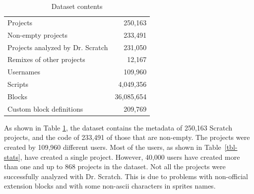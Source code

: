 \documentclass[10pt, conference]{IEEEtran}
\begin{document}

\begin{table}[]
	\centering
	\begin{tabular}{lr}
		\hline
		Projects & 250,163 \\
		Non-empty projects & 233,491 \\
		Projects analyzed by Dr. Scratch & 231,050 \\
		Remixes of other projects & 12,167 \\
		Usernames & 109,960 \\
		Scripts & 4,049,356 \\
		Blocks & 36,085,654 \\
		Custom block definitions & 209,769 \\
		\hline
	\end{tabular}
	\caption{Dataset contents}
	\label{tbl-size}
\end{table}

As shown in Table \ref{tbl-size}, the dataset contains the metadata of 250,163 Scratch projects, and the code of 233,491 of those that are non-empty.
The projects were created by 109,960 different users.
Most of the users, as shown in Table~\ref{tbl-stats}, have created a single project.
However, 40,000 users have created more than one and up to 868 projects in the dataset.
Not all the projects were successfully analyzed with Dr. Scratch. This is due to problems with non-official extension blocks and with some non-ascii characters in sprites names.
\end{document}
